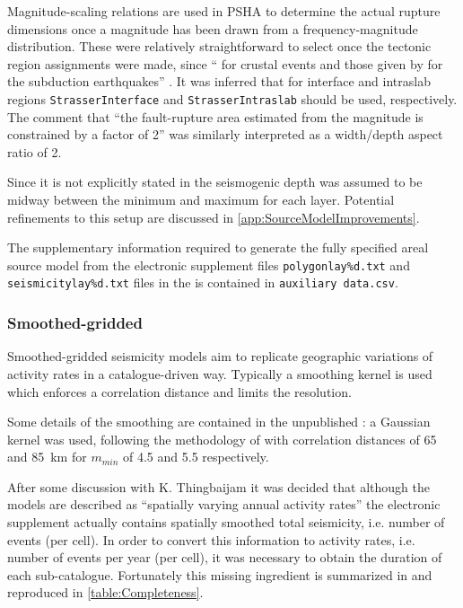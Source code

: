 \documentclass{article}
\begin{document}
Magnitude-scaling relations are used in PSHA to determine the actual rupture dimensions once a magnitude has been drawn from a frequency-magnitude distribution.
These were relatively straightforward to select once the tectonic region assignments were made, since ``\cite{wells1994new} for crustal events and those given by \cite{strasser2010scaling} for the subduction earthquakes'' \citep[p.~140]{nath2012probabilistic}.
It was inferred that for interface and intraslab regions \texttt{StrasserInterface} and \texttt{StrasserIntraslab} should be used, respectively.
The comment that ``the fault-rupture area estimated from the magnitude is constrained by a factor of 2'' \citep[p.~140]{nath2012probabilistic} was similarly interpreted as a width/depth aspect ratio of 2.

Since it is not explicitly stated in \cite{nath2012probabilistic} the seismogenic depth was assumed to be midway between the minimum and maximum for each layer.
Potential refinements to this setup are discussed in \autoref{app:SourceModelImprovements}.

The supplementary information required to generate the fully specified areal source model from the electronic supplement files \texttt{polygonlay\%d.txt} and \texttt{seismicitylay\%d.txt} files in the is contained in \texttt{auxiliary data.csv}.

\subsubsection{Smoothed-gridded}
\label{subsubsec:Smoothed}

Smoothed-gridded seismicity models aim to replicate geographic variations of activity rates in a catalogue-driven way.
Typically a smoothing kernel is used which enforces a correlation distance and limits the resolution.

Some details of the smoothing are contained in the unpublished \cite{thingbaijam2011seismogenic}: a Gaussian kernel was used, following the methodology of \cite{frankel1995mapping} with correlation distances of 65 and 85~km for $m_{min}$ of 4.5 and 5.5 respectively.

After some discussion with K.
Thingbaijam it was decided that although the models are described as ``spatially varying annual activity rates'' \cite[p.~140]{nath2012probabilistic} the electronic supplement actually contains spatially smoothed total seismicity, i.e. number of events (per cell).
In order to convert this information to activity rates, i.e. number of events per year (per cell), it was necessary to obtain the duration of each sub-catalogue.
Fortunately this missing ingredient is summarized in \cite[Table 1]{thingbaijam2011seismogenic} and reproduced in \autoref{table:Completeness}.
\end{document}
